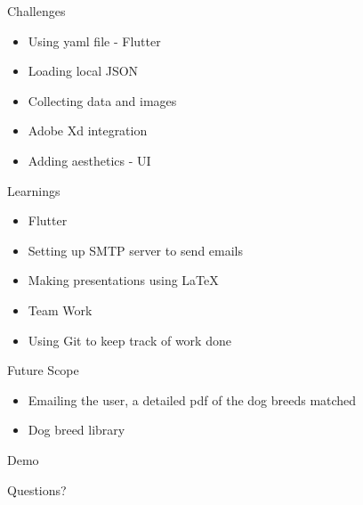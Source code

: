 \documentclass[14pt]{beamer}
\begin{document}
\begin{frame}{Challenges}
    \begin{itemize}
        \item Using yaml file - Flutter
        \item Loading local JSON
        \item Collecting data and images
        \item Adobe Xd integration
        \item Adding aesthetics - UI
    \end{itemize}
\end{frame}

\begin{frame}{Learnings}
    \begin{itemize}
        \item Flutter
        \item Setting up SMTP server to send emails
        \item Making presentations using LaTeX
        \item Team Work
        \item Using Git to keep track of work done
    \end{itemize}
\end{frame}


\begin{frame}{Future Scope}
    \begin{itemize}
        \item Emailing the user, a detailed pdf of the dog breeds matched
        \item Dog breed library
    \end{itemize}
\end{frame}

\begin{frame}[standout]
    Demo
\end{frame}

\begin{frame}[standout]
    Questions?
\end{frame}
\end{document}
